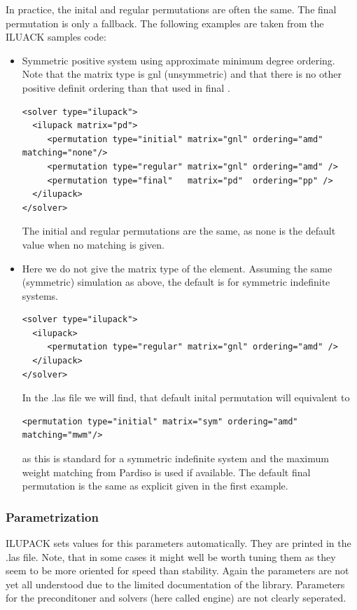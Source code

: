 In practice, the inital and regular permutations are often the same. The final permutation is only a fallback. The following examples are taken from the ILUACK samples code:

\begin{itemize}
\item Symmetric positive system using approximate minimum degree ordering. Note that the matrix type is gnl (unsymmetric) and that there is no other positive definit ordering than that used in final .
\begin{verbatim}
<solver type="ilupack">
  <ilupack matrix="pd">
     <permutation type="initial" matrix="gnl" ordering="amd" matching="none"/>
     <permutation type="regular" matrix="gnl" ordering="amd" />
     <permutation type="final"   matrix="pd"  ordering="pp" /> 
  </ilupack> 
</solver>
\end{verbatim}
The initial and regular permutations are the same, as none is the default value when no matching is given. 

\item Here we do not give the matrix type of the  element. Assuming the same
(symmetric) simulation as above, the default is  for symmetric indefinite systems. 
\begin{verbatim}
<solver type="ilupack">
  <ilupack>
     <permutation type="regular" matrix="gnl" ordering="amd" />
  </ilupack> 
</solver>
\end{verbatim}
In the .las file we will find, that default inital permutation will equivalent to
\begin{verbatim}
<permutation type="initial" matrix="sym" ordering="amd" matching="mwm"/>
\end{verbatim}
as this is standard for a symmetric indefinite system and the maximum weight matching from Pardiso is used if available. The default final permutation is the same as explicit given in the first example.
\end{itemize}


\subsubsection*{Parametrization}
ILUPACK sets values for this parameters automatically. They are printed in the .las file. Note, that in some cases it might well be worth tuning them as they seem to be more oriented for speed than stability. Again the parameters are not yet all understood due to the limited documentation of the library. Parameters for the preconditoner and solvers (here called engine) are not clearly seperated.

